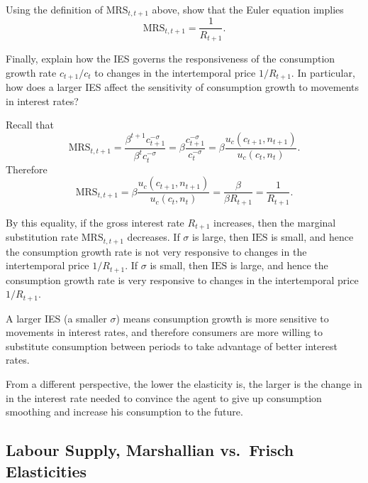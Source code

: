 \documentclass[dvipsnames,11pt]{article}
\begin{document}
\begin{enumerate}
            Using the definition of $\text{MRS}_{t,t+1}$ above, show that the Euler equation implies
            \[
            \text{MRS}_{t,t+1}
            =
            \frac{1}{R_{t+1}}.
            \]
            
            Finally, explain how the IES governs the responsiveness of the consumption growth rate $c_{t+1}/c_t$ to changes in the intertemporal price $1/R_{t+1}$. In particular, how does a larger IES affect the sensitivity of consumption growth to movements in interest rates?

            \begin{solution}

                Recall that
\begin{equation*}
    \mathrm{MRS}_{t,t+1}= \frac{\beta^{t+1} c_{t+1}^{-\sigma}}{\beta^tc_t^{-\sigma}}  = \beta \frac{c_{t+1}^{-\sigma}}{c_t^{-\sigma}} = \beta \frac{u_c(c_{t+1},n_{t+1})}{u_c(c_t,n_t)}.
\end{equation*}
Therefore 
\begin{equation*}
     \mathrm{MRS}_{t,t+1}= \beta \frac{u_c(c_{t+1},n_{t+1})}{u_c(c_t,n_t)} = \frac{\beta}{\beta R_{t+1}} = \frac{1}{R_{t+1}}.
\end{equation*}

By this equality, if the gross interest rate $R_{t+1}$ increases, then the marginal substitution rate $\mathrm{MRS}_{t,t+1}$ decreases. If $\sigma$ is large, then $\mathrm{IES}$ is small, and hence the consumption growth rate is not very responsive to changes in the intertemporal price $1/R_{t+1}$. If $\sigma$ is small, then $\mathrm{IES}$ is large, and hence the consumption growth rate is very responsive to changes in the intertemporal price $1/R_{t+1}$. 

A larger IES (a smaller $\sigma$) means consumption growth is more sensitive to movements in interest rates, and therefore consumers are more willing to substitute consumption between periods to take advantage of better interest rates. 

From a different perspective, the lower the elasticity is, the larger is the change in in the interest rate needed to convince the agent to give up consumption smoothing and increase his consumption to the future.
                
            \end{solution}

\end{enumerate}

\subsection{Labour Supply, Marshallian vs.\ Frisch Elasticities}
\end{document}
